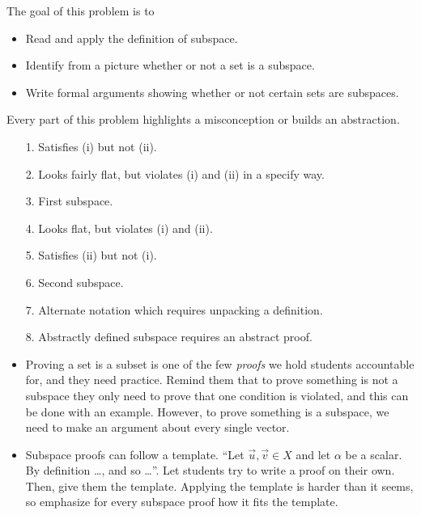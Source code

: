 \documentclass{problemset}
\begin{document}
	\question
	\begin{annotation}
		\begin{goals}

			The goal of this problem is to
			\begin{itemize}
				\item Read and apply the definition of subspace.
				\item Identify from a picture whether or not a set is a subspace.
				\item Write formal arguments showing whether or not certain sets are subspaces.
			\end{itemize}
		\end{goals}

		\begin{notes}
			Every part of this problem highlights a misconception or builds an abstraction.
			\begin{enumerate}
				\item[1.] Satisfies (i) but not (ii).
				\item[2.] Looks fairly flat, but violates (i) and (ii) in a specify way.
				\item[3.] First subspace.
				\item[4.] Looks flat, but violates (i) and (ii).
				\item[5.] Satisfies (ii) but not (i).
				\item[6.] Second subspace.
				\item[7.] Alternate notation which requires unpacking a definition.
				\item[8.] Abstractly defined subspace requires an abstract proof.
			\end{enumerate}
			\begin{itemize}
				\item Proving a set is a subset is one of the few \emph{proofs} we hold
					students accountable for, and they need practice. Remind them
					that to prove something is not a subspace they only need to
					prove that one condition is violated, and this can be done with
					an example. However, to prove something is a subspace, we need
					to make an argument about every single vector.
				\item Subspace proofs can follow a template. ``Let $\vec u,\vec v\in X$ and
					let $\alpha$ be a scalar. By definition \ldots, and so \ldots''. Let
					students try to write a proof on their own. Then, give them
					the template. Applying the template is harder than it seems, so
					emphasize for every subspace proof how it fits the template.
			\end{itemize}
		\end{notes}
	\end{annotation}
\end{document}
